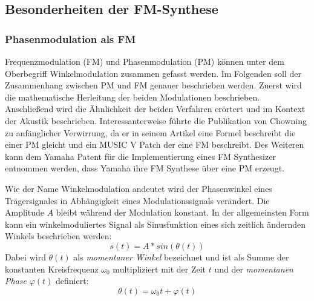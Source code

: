 \subsection{Besonderheiten der FM-Synthese}

\subsubsection{Phasenmodulation als FM}
Frequenzmodulation (FM) und Phasenmodulation (PM) können unter dem Oberbegriff Winkelmodulation zusammen gefasst werden. Im Folgenden soll der Zusammenhang zwischen PM und FM genauer beschrieben werden. Zuerst wird die mathematische Herleitung der beiden Modulationen beschrieben. Anschließend wird die Ähnlichkeit der beiden Verfahren erörtert und im Kontext der Akustik beschrieben. Interessanterweise führte die Publikation von Chowning zu anfänglicher Verwirrung, da er in seinem Artikel eine Formel beschreibt die einer PM gleicht und ein MUSIC V Patch der eine FM beschreibt. \cite{rossum1999method} Des Weiteren kann dem Yamaha Patent für die Implementierung eines FM Synthesizer entnommen werden, dass Yamaha ihre FM Synthese über eine PM erzeugt. \cite{oya1987electronic} 

Wie der Name Winkelmodulation andeutet wird der Phasenwinkel eines Trägersignales in Abhängigkeit eines Modulationssignals verändert. Die Amplitude \(A\) bleibt während der Modulation konstant. In der allgemeinsten Form kann ein winkelmoduliertes Signal als Sinusfunktion eines sich zeitlich ändernden Winkels beschrieben werden:
\begin{equation}
s(t)=A*sin(\theta(t))
\label{eq:signal_basis_funktion}
\end{equation}
Dabei wird \(\theta(t)\) als \textit{momentaner Winkel} bezeichnet und ist als Summe der konstanten Kreisfrequenz $\omega_0$ multipliziert mit der Zeit $t$ und der \textit{momentanen Phase} $\varphi(t)$ definiert:
\begin{equation*}
\theta(t)=\omega_0t + \varphi(t)
\end{equation*}

